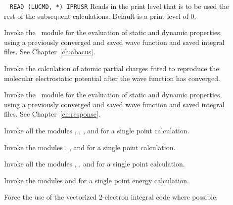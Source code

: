 \begin{description}
\item[]\verb| |\newline
\verb|READ (LUCMD, *) IPRUSR|
Reads in the print level that is to be used the rest of the subsequent
calculations. Default is a print level of 0.

\item[] Invoke the \aba\ module for the evaluation of static
and dynamic properties, using a previously converged and saved wave function and saved integral files. See Chapter~\ref{ch:abacus}.

\item[] Invoke the calculation of atomic partial charges fitted to reproduce
the molecular electrostatic potential after the wave function has converged.

\item[]
Invoke the \resp\ module for the evaluation of static and dynamic
properties, using a previously converged and saved wave function and saved integral files. See Chapter~\ref{ch:response}.

\item[]
Invoke all the modules {\her}, {\sir}, {\resp}, and {\aba} for a single point calculation.

\item[]
Invoke the modules {\her}, {\sir}, and {\aba} for a single point calculation.

\item[]
Invoke all the modules {\her}, {\sir}, and {\resp} for a single point calculation.

\item[]
Invoke the modules {\her} and {\sir} for a single point energy calculation.


\item[] Force the use of the vectorized 2-electron integral code {\eri} where possible.




\end{description}
